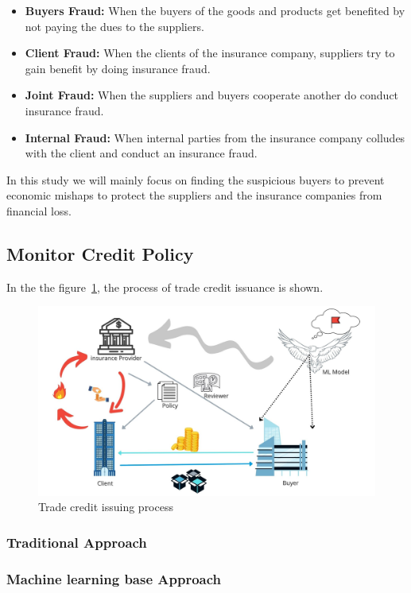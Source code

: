 \begin{itemize}
    \item \textbf{Buyers Fraud:} When the buyers of the goods and products get benefited by not paying the dues to the suppliers.
    \item \textbf{Client Fraud:} When the clients of the insurance company, suppliers try to gain benefit by doing insurance fraud.
    \item \textbf{Joint Fraud:} When the suppliers and buyers cooperate another do conduct insurance fraud.
    \item \textbf{Internal Fraud:} When internal parties from the insurance company colludes with the client and conduct an insurance fraud.
\end{itemize}

In this study we will mainly focus on finding the suspicious buyers to prevent economic mishaps to protect the suppliers and the insurance companies from financial loss.


\subsection{Monitor Credit Policy}\label{subsec:monitor-credit-policy}


In the the figure~\ref{fig:trade_credit}, the process of trade credit issuance is shown.

\begin{figure}[htp]
    \centering
    \includegraphics[width=\linewidth]{figures/monitor_buyers.jpg}
    \caption{Trade credit issuing process}
    \label{fig:trade_credit}
\end{figure}

\subsubsection{Traditional Approach}

\subsubsection{Machine learning base Approach}



